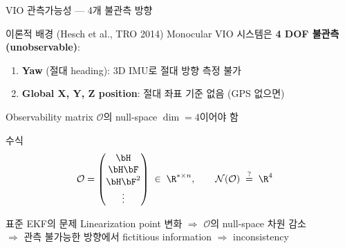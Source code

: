 \begin{frame}[shrink=10]{VIO 관측가능성 --- 4개 불관측 방향}
  \begin{block}{이론적 배경 (Hesch et al., TRO 2014)}
    Monocular VIO 시스템은 \textbf{4 DOF 불관측(unobservable)}:
    \begin{enumerate}
      \item \textbf{Yaw} (절대 heading): 3D IMU로 절대 방향 측정 불가
      \item \textbf{Global X, Y, Z position}: 절대 좌표 기준 없음 (GPS 없으면)
    \end{enumerate}
    Observability matrix $\mathcal{O}$의 null-space $\dim = 4$이어야 함
  \end{block}
  \begin{block}{수식}
    \begin{align*}
      \mathcal{O} &= \begin{pmatrix}\bH \\ \bH\bF \\ \bH\bF^2 \\ \vdots\end{pmatrix}
      \;\in\;\R^{*\times n}, \qquad
      \mathcal{N}(\mathcal{O}) \;\overset{?}{=}\; \R^4
    \end{align*}
  \end{block}
  \begin{alertblock}{표준 EKF의 문제}
    Linearization point 변화 $\Rightarrow$ $\mathcal{O}$의 null-space 차원 감소\\
    $\Rightarrow$ 관측 불가능한 방향에서 fictitious information $\Rightarrow$ inconsistency
  \end{alertblock}
\end{frame}


